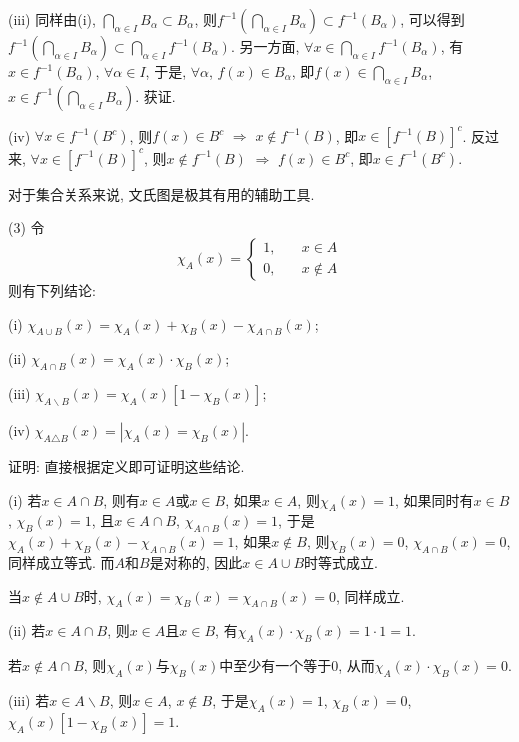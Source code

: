 \documentclass[12pt,a4paper,openany]{book}
\begin{document}
(iii) 同样由(i), $\bigcap\limits_{\alpha \in I}{B_{\alpha}} \subset B_{\alpha}$, 则$f^{-1}(\bigcap\limits_{\alpha \in I}{B_{\alpha}}) \subset f^{-1}(B_{\alpha})$, 可以得到$f^{-1}(\bigcap\limits_{\alpha \in I}{B_{\alpha}}) \subset \bigcap\limits_{\alpha \in I}{f^{-1}(B_{\alpha})}$. 另一方面, $\forall x \in \bigcap\limits_{\alpha \in I}{f^{-1}(B_{\alpha})}$, 有$x \in f^{-1}(B_{\alpha})$, $\forall \alpha \in I$, 于是, $\forall \alpha$, $f(x) \in B_{\alpha}$, 即$f(x) \in \bigcap\limits_{\alpha \in I}{B_{\alpha}}$, $x \in f^{-1}(\bigcap\limits_{\alpha \in I}{B_{\alpha}})$. 获证.

(iv) $\forall x \in f^{-1}(B^c)$, 则$f(x) \in B^c$ $\Rightarrow$ $x \notin f^{-1}(B)$, 即$x \in [f^{-1}(B)]^c$. 反过来, $\forall x \in [f^{-1}(B)]^c$, 则$x \notin f^{-1}(B)$ $\Rightarrow$ $f(x) \in B^c$, 即$x \in f^{-1}(B^c)$.

对于集合关系来说, 文氏图是极其有用的辅助工具.

(3) 令
$$
\chi_A(x) = \left\{
\begin{aligned}
1, \quad & x \in A \\
0, \quad & x \notin A
\end{aligned}
\right.
$$
则有下列结论:

(i) $\chi_{A \cup B}(x) = \chi_{A}(x) + \chi_{B}(x) - \chi_{A \cap B}(x)$;

(ii) $\chi_{A \cap B}(x) = \chi_A(x) \cdot \chi_B(x)$;

(iii) $\chi_{A \backslash B}(x) = \chi_A(x)[1 - \chi_B(x)]$;

(iv) $\chi_{A \triangle B}(x) = |\chi_A(x) = \chi_B(x)|$.

证明: 直接根据定义即可证明这些结论.

(i) 若$x \in A \cap B$, 则有$x \in A$或$x \in B$, 如果$x \in A$, 则$\chi_A(x) = 1$, 如果同时有$x \in B$, $\chi_B(x) = 1$, 且$x \in A \cap B$, $\chi_{A \cap B}(x) = 1$, 于是$\chi_A(x) + \chi_B(x) - \chi_{A \cap B}(x) = 1$, 如果$x \notin B$, 则$\chi_B(x) = 0$, $\chi_{A \cap B}(x) = 0$, 同样成立等式. 而$A$和$B$是对称的, 因此$x \in A \cup B$时等式成立.

当$x \notin A \cup B$时, $\chi_A(x) = \chi_B(x) = \chi_{A \cap B}(x) = 0$, 同样成立.

(ii) 若$x \in A \cap B$, 则$x \in A$且$x \in B$, 有$\chi_A(x) \cdot \chi_B(x) = 1 \cdot 1 = 1$.

若$x \notin A \cap B$, 则$\chi_A(x)$与$\chi_B(x)$中至少有一个等于$0$, 从而$\chi_A(x) \cdot \chi_B(x) = 0$.

(iii) 若$x \in A \backslash B$, 则$x \in A$, $x \notin B$, 于是$\chi_A(x) = 1$, $\chi_B(x) = 0$, $\chi_A(x)[1 - \chi_B(x)] = 1$.
\end{document}
